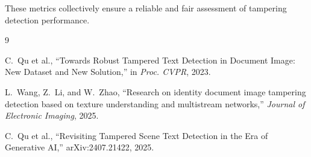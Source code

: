 \documentclass[12pt]{article}
\begin{document}
These metrics collectively ensure a reliable and fair assessment of tampering
detection performance.



\begin{thebibliography}{9}

    C.~Qu et al.,
    ``Towards Robust Tampered Text Detection in Document Image: New Dataset and New Solution,''
    in \textit{Proc. CVPR}, 2023.

    L.~Wang, Z.~Li, and W.~Zhao,
    ``Research on identity document image tampering detection based on texture understanding and multistream networks,''
    \textit{Journal of Electronic Imaging}, 2025.

    C.~Qu et al.,
    ``Revisiting Tampered Scene Text Detection in the Era of Generative AI,''
    arXiv:2407.21422, 2025.

\end{thebibliography}
\end{document}
